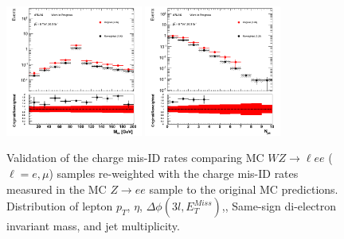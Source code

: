 \begin{figure}[htp]
 \includegraphics[width=0.4\textwidth]{figures/ChargeMisID/Validation_ChargeMisIDRates_WZ_Mee.png}
 \includegraphics[width=0.4\textwidth]{figures/ChargeMisID/Validation_ChargeMisIDRates_WZ_JetMultiplicity.png}

 \caption{Validation of the charge mis-ID rates comparing 
 MC $WZ\rightarrow \ell ee$ ($\ell=e,\mu$) samples re-weighted with the 
 charge mis-ID rates measured in the MC $Z\to{}ee$ 
 sample to the original MC predictions. Distribution of 
 lepton $p_{T}$, $\eta$, $\Delta \phi(3l,E_{T}^{Miss})$,\met{}, Same-sign 
 di-electron invariant mass, and jet multiplicity.}
 \label{fig:ChargeMisID_Validation_WZ}
 \end{figure}
 
